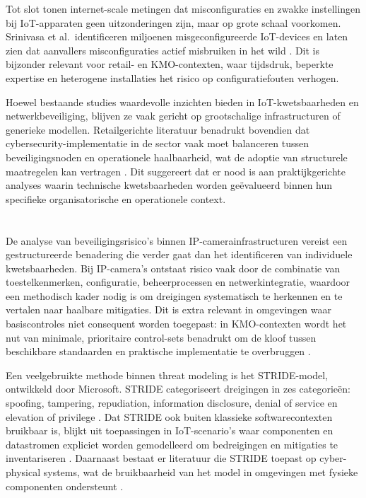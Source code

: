 Tot slot tonen internet-scale metingen dat misconfiguraties en zwakke instellingen bij IoT-apparaten geen uitzonderingen zijn, maar op grote schaal voorkomen. Srinivasa et al.\ identificeren miljoenen misgeconfigureerde IoT-devices en laten zien dat aanvallers misconfiguraties actief misbruiken in het wild \autocite{srinivasa2021open}. Dit is bijzonder relevant voor retail- en KMO-contexten, waar tijdsdruk, beperkte expertise en heterogene installaties het risico op configuratiefouten verhogen.

Hoewel bestaande studies waardevolle inzichten bieden in IoT-kwetsbaarheden en netwerkbeveiliging, blijven ze vaak gericht op grootschalige infrastructuren of generieke modellen. Retailgerichte literatuur benadrukt bovendien dat cybersecurity-implementatie in de sector vaak moet balanceren tussen beveiligingsnoden en operationele haalbaarheid, wat de adoptie van structurele maatregelen kan vertragen \autocite{ardhaninggar2024review}. Dit suggereert dat er nood is aan praktijkgerichte analyses waarin technische kwetsbaarheden worden geëvalueerd binnen hun specifieke organisatorische en operationele context.

\section{}%
\label{sec:kaders-modellen}

De analyse van beveiligingsrisico’s binnen IP-camerainfrastructuren vereist een gestructureerde benadering die verder gaat dan het identificeren van individuele kwetsbaarheden. Bij IP-camera’s ontstaat risico vaak door de combinatie van toestelkenmerken, configuratie, beheerprocessen en netwerkintegratie, waardoor een methodisch kader nodig is om dreigingen systematisch te herkennen en te vertalen naar haalbare mitigaties. Dit is extra relevant in omgevingen waar basiscontroles niet consequent worden toegepast: in KMO-contexten wordt het nut van minimale, prioritaire control-sets benadrukt om de kloof tussen beschikbare standaarden en praktische implementatie te overbruggen \autocite{pawar2022lcci}.

Een veelgebruikte methode binnen threat modeling is het STRIDE-model, ontwikkeld door Microsoft. STRIDE categoriseert dreigingen in zes categorieën: spoofing, tampering, repudiation, information disclosure, denial of service en elevation of privilege \autocite{Microsoft2022bSTRIDE}. Dat STRIDE ook buiten klassieke softwarecontexten bruikbaar is, blijkt uit toepassingen in IoT-scenario’s waar componenten en datastromen expliciet worden gemodelleerd om bedreigingen en mitigaties te inventariseren \autocite{AlAsif2022arXivSTRIDEAgri}. Daarnaast bestaat er literatuur die STRIDE toepast op cyber-physical systems, wat de bruikbaarheid van het model in omgevingen met fysieke componenten ondersteunt \autocite{khan2017stride}.

